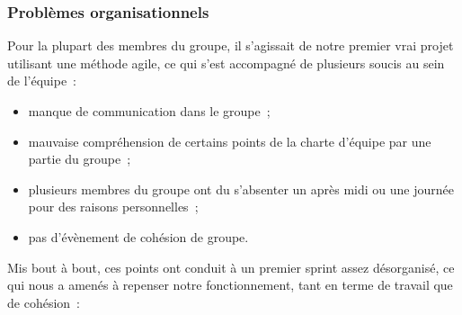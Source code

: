 \documentclass[11pt]{article}
\begin{document}
\subsubsection{Problèmes organisationnels}

Pour la plupart des membres du groupe, il s'agissait de notre premier
vrai projet utilisant une méthode agile, ce qui s'est accompagné de
plusieurs soucis au sein de l'équipe~:

\begin{itemize}
\item manque de communication dans le groupe~;
\item mauvaise compréhension de certains points de la charte d'équipe
  par une partie du groupe~;
\item plusieurs membres du groupe ont du s'absenter un après midi ou
  une journée pour des raisons personnelles~;
\item pas d'évènement de cohésion de groupe.
\end{itemize}

Mis bout à bout, ces points ont conduit à un premier sprint assez
désorganisé, ce qui nous a amenés à repenser notre
fonctionnement, tant en terme de travail que de cohésion~:
\end{document}
